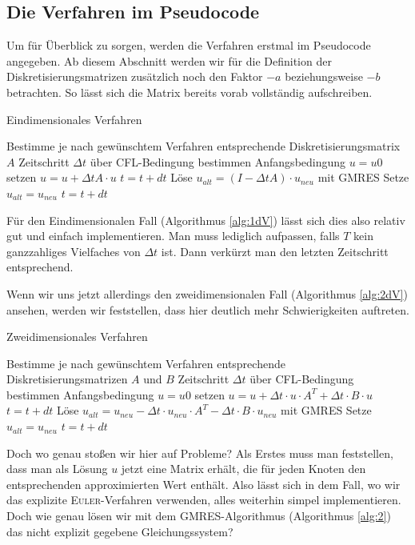 \documentclass[12pt,a4paper]{scrartcl}
\numberwithin{equation}{section} %
\theoremstyle{definition}
\theoremstyle{plain}
\begin{document}
\subsection{Die Verfahren im Pseudocode}
Um für Überblick zu sorgen, werden die Verfahren erstmal im Pseudocode angegeben. Ab diesem Abschnitt werden wir für die Definition der Diskretisierungsmatrizen zusätzlich noch den Faktor $-a$ beziehungsweise $-b$ betrachten. So lässt sich die Matrix bereits vorab vollständig aufschreiben.
\begin{algorithm}
\caption{Eindimensionales Verfahren}
\label{alg:1dV}
\begin{algorithmic}
\STATE Bestimme je nach gewünschtem Verfahren entsprechende Diskretisierungsmatrix $A$
\STATE Zeitschritt $\Delta t$ über CFL-Bedingung bestimmen
\STATE Anfangsbedingung $u=u0$ setzen
\STATE$u=u+\Delta tA\cdot u$
\STATE $t=t+dt$
\ENDWHILE
{}
\STATE Löse $u_{alt}=(I-\Delta tA)\cdot u_{neu}$ mit GMRES
\STATE Setze $u_{alt}=u_{neu}$
\STATE $t=t+dt$
\ENDWHILE
\ENDIF
\end{algorithmic}
\end{algorithm}
Für den Eindimensionalen Fall (Algorithmus \ref{alg:1dV}) lässt sich dies also relativ gut und einfach implementieren. Man muss lediglich aufpassen, falls $T$ kein ganzzahliges Vielfaches von $\Delta t$ ist. Dann verkürzt man den letzten Zeitschritt entsprechend. \par Wenn wir uns jetzt allerdings den zweidimensionalen Fall (Algorithmus \ref{alg:2dV}) ansehen, werden wir feststellen, dass hier deutlich mehr Schwierigkeiten auftreten.
\begin{algorithm}
\caption{Zweidimensionales Verfahren}
\label{alg:2dV}
\begin{algorithmic}
\STATE Bestimme je nach gewünschtem Verfahren entsprechende Diskretisierungsmatrizen $A$ und $B$
\STATE Zeitschritt $\Delta t$ über CFL-Bedingung bestimmen 
\STATE Anfangsbedingung $u=u0$ setzen
\STATE$u=u+\Delta t\cdot u\cdot A^T+\Delta t\cdot B\cdot u$
\STATE $t=t+dt$
\ENDWHILE
{}
\STATE Löse $u_{alt}=u_{neu}-\Delta t\cdot u_{neu}\cdot A^T-\Delta t\cdot B\cdot u_{neu}$ mit GMRES
\STATE Setze $u_{alt}=u_{neu}$
\STATE $t=t+dt$
\ENDWHILE
\ENDIF
\end{algorithmic}
\end{algorithm}
Doch wo genau stoßen wir hier auf Probleme? Als Erstes muss man feststellen, dass man als Lösung $u$ jetzt eine Matrix erhält, die für jeden Knoten den entsprechenden approximierten Wert enthält. Also lässt sich in dem Fall, wo wir das explizite \textsc{Euler}-Verfahren verwenden, alles weiterhin simpel implementieren. Doch wie genau lösen wir mit dem GMRES-Algorithmus (Algorithmus \ref{alg:2}) das nicht explizit gegebene Gleichungssystem? 
\end{document}
